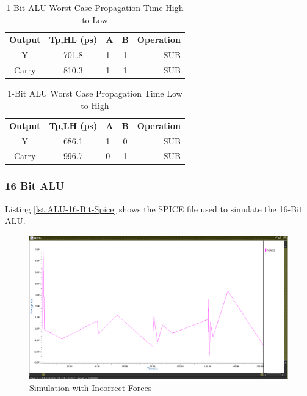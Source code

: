 \documentclass[11pt]{article}
\begin{document}
		
			\begin{table}[H]
				\centering
				\caption{1-Bit ALU Worst Case Propagation Time High to Low}
				\label{tab:ALU-1-Bit-Tpd-HL}
				\begin{tabular}{|cclcr|}
					\hline
					\textbf{Output} & \textbf{Tp,HL (ps)} & \textbf{A} & \textbf{B} & \textbf{Operation} \\
					Y               & 701.8                   & 1          & 1          & SUB                \\
					Carry           & 810.3                   & 1          & 1          & SUB                \\
					\hline
				\end{tabular}
			\end{table}
		
			\begin{table}[H]
				\centering
				\caption{1-Bit ALU Worst Case Propagation Time Low to High}
				\label{tab:ALU-1-Bit-Tpd-LH}
				\begin{tabular}{|cclcr|}
					\hline
					\textbf{Output} & \textbf{Tp,LH (ps)} & \textbf{A} & \textbf{B} & \textbf{Operation} \\
					Y               & 686.1                   & 1          & 0          & SUB                \\
					Carry           & 996.7                   & 0          & 1          & SUB                \\
					\hline
				\end{tabular}
			\end{table}
		
		\subsubsection{16 Bit ALU}
		
			Listing \ref{lst:ALU-16-Bit-Spice} shows the SPICE file used to simulate the 16-Bit ALU.  
		
		
			\begin{figure}[H]
				\centering
				\includegraphics[width=0.7\linewidth]{"Pictures/Terrible Simulation"}
				\caption{Simulation with Incorrect Forces}
				\label{fig:terrible-simulation}
			\end{figure}
			
\end{document}
